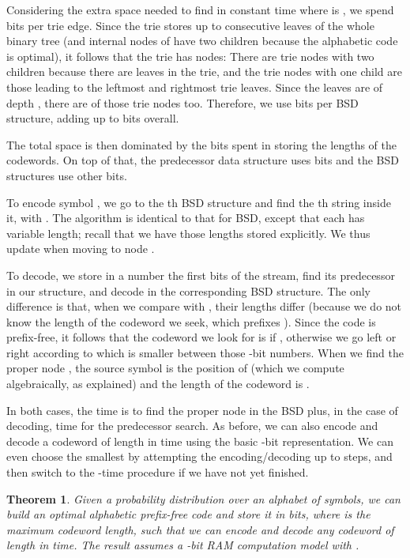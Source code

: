\documentclass[preprint,12pt]{elsarticle}
\newtheorem{theorem}{Theorem}
\begin{document}
Considering the extra space needed to find in constant time where is , we 
spend  bits per trie edge. Since the trie stores up to  consecutive
leaves of the whole binary tree  (and internal nodes of  have two
children because the alphabetic code is optimal), it follows that the trie
has  nodes: There are  trie nodes with two children because
there are  leaves in the trie, and the trie nodes with one child are those
leading to the leftmost and rightmost trie leaves. Since the leaves are of 
depth , there are  of those trie nodes too.
Therefore, we use  bits per BSD structure,
adding up to  bits overall. 

The total space is then dominated by the  bits 
spent in
storing the lengths of the codewords. On top of that, the predecessor data 
structure uses  bits and the BSD structures use other 
bits.

To encode symbol , we go to the th BSD structure and
find the th string inside it, with .
The algorithm is identical to that for BSD, except that each  has 
variable length; recall that we have those lengths  stored explicitly. 
We thus update  when moving to node
.

To decode, we store in a number  the first  bits of the stream, find its 
predecessor in our structure, and decode  in the corresponding BSD structure.
The only difference is that, when we compare  with , their lengths
differ (because we do not know the length  of the codeword we seek, which
prefixes ). Since the code is prefix-free, it follows that the codeword we
look for is  if , otherwise we go left or right
according to which is smaller between those -bit numbers. When we find
the proper node , the source symbol is the position  of  (which we
compute algebraically, as explained) and the length of the codeword is 
.

In both cases, the time is  to find the proper node in the BSD
plus, in the case of decoding,  time for the predecessor search.
As before, we can also encode and decode a codeword of length  in time 
 using the basic -bit representation. We can even choose
the smallest by attempting the encoding/decoding up to  steps, and then
switch to the -time procedure if we have not yet finished.

\begin{theorem}
\label{thm:optimal}
Given a probability distribution over an alphabet of  symbols, we 
can build an optimal alphabetic prefix-free code and store it in 
 bits, where  is the maximum codeword length, 
such that we can encode and decode any codeword of length  in 
 time.
The result assumes a -bit RAM computation model with .
\end{theorem}
\end{document}

